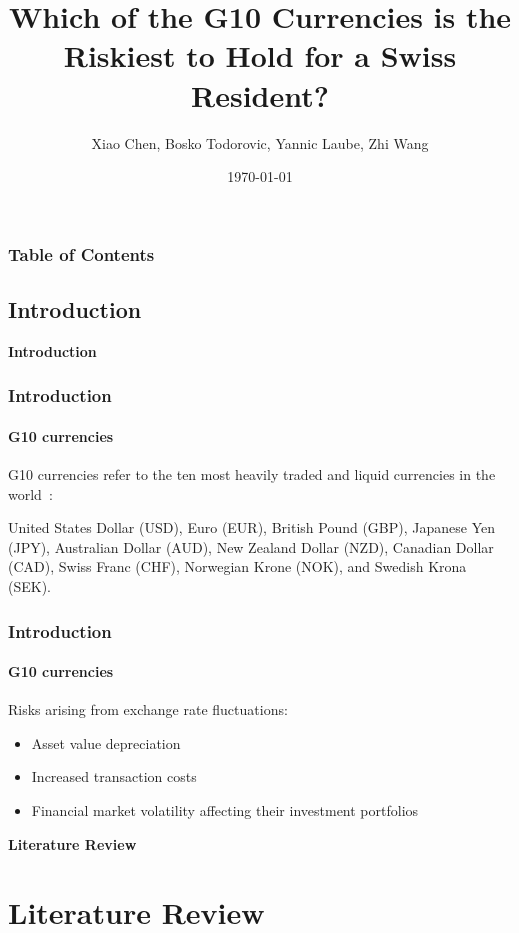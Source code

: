 \documentclass[10pt]{beamer}
\author{Xiao Chen, Bosko Todorovic, Yannic Laube, Zhi Wang}
\title{Which of the G10 Currencies is the Riskiest to Hold for a Swiss Resident?}
\institute{University of Zurich}
\date{\today}
\begin{document}
\begin{frame}
\titlepage
\end{frame}
\begin{frame}
\frametitle{Table of Contents}
\tableofcontents
\end{frame}
\begin{frame}
\section{Introduction}
\centering \LARGE \textbf{Introduction}
\end{frame}
\begin{frame}
\frametitle{Introduction}
\framesubtitle{G10 currencies}
G10 currencies refer to the ten most heavily traded and liquid currencies in the world~\cite{bis2022report}: 

United States Dollar (USD), Euro (EUR), British Pound (GBP), Japanese Yen (JPY), Australian Dollar (AUD), New Zealand Dollar (NZD), Canadian Dollar (CAD), Swiss Franc (CHF), Norwegian Krone (NOK), and Swedish Krona (SEK).

\end{frame}
\begin{frame}
\frametitle{Introduction}
\framesubtitle{G10 currencies}
Risks arising from exchange rate fluctuations:
\begin{itemize}
    \item Asset value depreciation
    \item Increased transaction costs
    \item Financial market volatility affecting their investment portfolios
\end{itemize}
\end{frame}
\begin{frame}
\centering \LARGE \textbf{Literature Review}
\section{Literature Review}
\end{frame}
\end{document}
